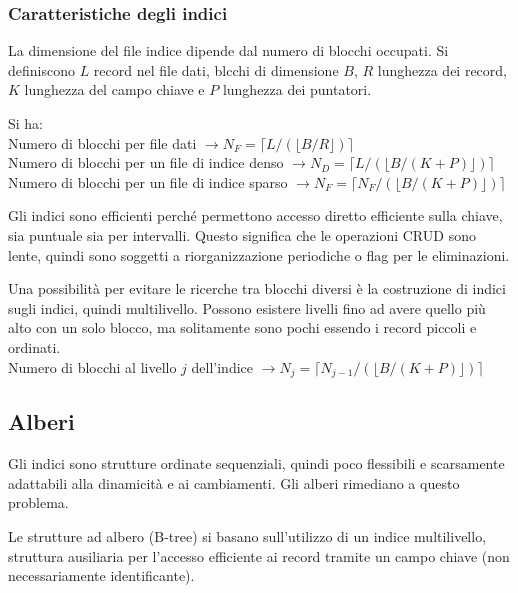 \subsubsection{Caratteristiche degli indici}
La dimensione del file indice dipende dal numero di blocchi occupati. Si definiscono $L$ record nel file dati, blcchi di dimensione $B$, $R$ lunghezza dei record, $K$ lunghezza del campo chiave e $P$ lunghezza dei puntatori.

Si ha: \\
Numero di blocchi per file dati $\rightarrow N_F = \lceil L/(\lfloor B/R \rfloor) \rceil$ \\
Numero di blocchi per un file di indice denso $\rightarrow N_D = \lceil L/(\lfloor B/(K+P) \rfloor) \rceil$ \\
Numero di blocchi per un file di indice sparso $\rightarrow N_F = \lceil N_F/(\lfloor B/(K+P) \rfloor) \rceil$

Gli indici sono efficienti perché permettono accesso diretto efficiente sulla chiave, sia puntuale sia per intervalli. Questo significa che le operazioni CRUD sono lente, quindi sono soggetti a riorganizzazione periodiche o flag per le eliminazioni.

Una possibilità per evitare le ricerche tra blocchi diversi è la costruzione di indici sugli indici, quindi multilivello. Possono esistere livelli fino ad avere quello più alto con un solo blocco, ma solitamente sono pochi essendo i record piccoli e ordinati. \\
Numero di blocchi al livello $j$ dell'indice $\rightarrow N_j = \lceil N_{j-1}/(\lfloor B/(K+P) \rfloor) \rceil$
 
\subsection{Alberi}
Gli indici sono strutture ordinate sequenziali, quindi poco flessibili e scarsamente adattabili alla dinamicità e ai cambiamenti. Gli alberi rimediano a questo problema.

Le strutture ad albero (B-tree) si basano sull'utilizzo di un indice multilivello, struttura ausiliaria per l'accesso efficiente ai record tramite un campo chiave (non necessariamente identificante).








